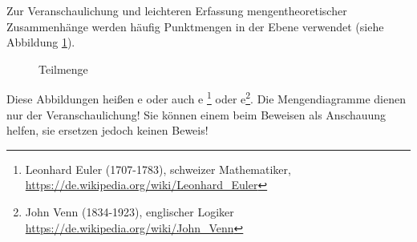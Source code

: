 \begin{Unit}[Anmerkung]
Zur Veranschaulichung und leichteren Erfassung mengentheoretischer 
Zusammenhänge werden häufig Punktmengen in der Ebene verwendet (siehe 
Abbildung \ref{Abb:Mng:Teilmenge}). 

\begin{figure}[htbp]
\begin{center}
  \setlength{\unitlength}{1.0cm}
  \caption{Teilmenge}
  \label{Abb:Mng:Teilmenge}
\end{center}
\end{figure}

Diese Abbildungen heißen 
e oder auch e
\footnote{Leonhard Euler (1707-1783), 
schweizer Mathematiker,
\url{https://de.wikipedia.org/wiki/Leonhard_Euler}} oder 
e\footnote{John Venn
(1834-1923), englischer Logiker 
\url{https://de.wikipedia.org/wiki/John_Venn}}. Die 
Mengendiagramme dienen nur der Veranschaulichung! Sie können einem beim 
Beweisen als Anschauung helfen, sie ersetzen jedoch keinen Beweis!
\end{Unit}

